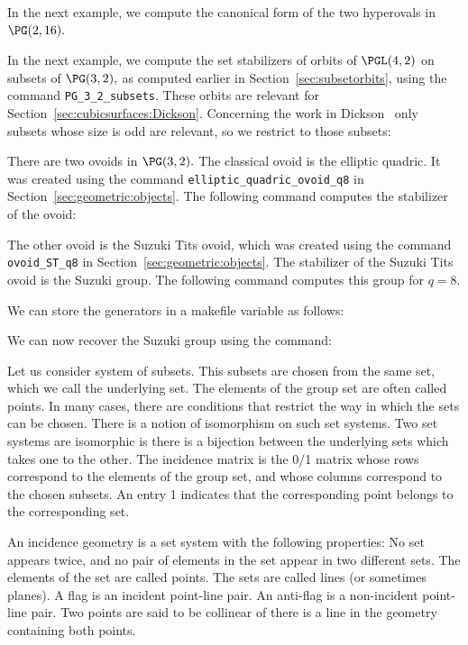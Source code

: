 \bigskip

In the next example, we compute the canonical form of the two hyperovals in $\PG(2,16).$
{\tt

}

\bigskip

In the next example, we compute the set stabilizers of orbits of $\PGL(4,2)$ on subsets of $\PG(3,2),$ 
as computed earlier in Section~\ref{sec:subsetorbits}, using the command \verb'PG_3_2_subsets'.
These orbits are relevant for Section~\ref{sec:cubicsurfaces:Dickson}. 
Concerning the work in Dickson~\cite{Dickson15} only subsets whose size is odd are relevant, 
so we restrict to those subsets:
{\tt

}

\bigskip

There are two ovoids in $\PG(3,2).$ The classical ovoid is the elliptic quadric. It was created using the command \verb'elliptic_quadric_ovoid_q8' in Section~\ref{sec:geometric:objects}.
The following command computes the stabilizer of the ovoid:
{\tt

}
The other ovoid is the Suzuki Tits ovoid,  which was created using the command \verb'ovoid_ST_q8' in Section~\ref{sec:geometric:objects}.
The stabilizer of the Suzuki Tits ovoid is the Suzuki group.
The following command computes this group for $q=8.$
{\tt

}
We can store the generators in a makefile variable as follows:
{\tt

}
We can now recover the Suzuki group using the command:
{\tt

}


\bigskip


Let us consider system of subsets. 
This subsets are chosen from the same set, which we call the underlying set. 
The elements of the group set are often called points.
In many cases, there are conditions that restrict the way in which the sets can be chosen. 
There is a notion of isomorphism on such set systems. 
Two set systems are isomorphic is there is a bijection between the underlying 
sets which takes one to the other. 
The incidence matrix is the 0/1 matrix whose rows correspond to the elements of the group set, 
and whose columns correspond to the chosen subsets. An entry 1 indicates that the 
corresponding point belongs to the corresponding set.

\bigskip


An incidence geometry is a set system with the following properties:
No set appears twice, and no pair of elements in the set appear in two different sets. 
The elements of the set are called points. 
The sets are called lines (or sometimes planes). 
A flag is an incident point-line pair.
An anti-flag is a non-incident point-line pair.
Two points are said to be collinear of there is a line in the geometry containing both points.

